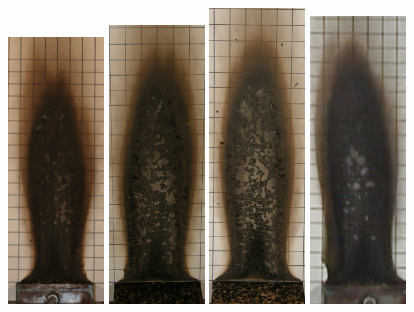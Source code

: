 \documentclass[twoside]{uocthesis}
\begin{document}
\begin{figure}[p]
	\includegraphics[width=1.0in]{../Figures/GBNG24_IMG_9020}
	\includegraphics[width=1.0in]{../Figures/GBNG25_P5130419}
	\includegraphics[width=1.0in]{../Figures/GBNG26_P5130427}
	\includegraphics[width=1.0in]{../Figures/GBNG27}

\end{figure}
\end{document}
